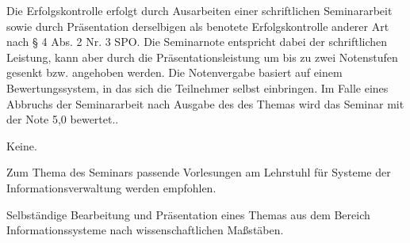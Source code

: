 \begin{course}

\setdoclanguagegerman
{}



\coursehead


\label{cour_6111.dp_997}


\begin{styleenv}
\begin{assessment}
Die Erfolgskontrolle erfolgt durch Ausarbeiten einer schriftlichen Seminararbeit sowie durch Präsentation derselbigen als benotete Erfolgskontrolle anderer Art nach § 4 Abs. 2 Nr. 3 SPO. \newline
Die Seminarnote entspricht dabei der schriftlichen Leistung, kann aber durch die Präsentationsleistung um bis zu zwei Notenstufen gesenkt bzw. angehoben werden. Die Notenvergabe basiert auf einem Bewertungssystem, in das sich die Teilnehmer selbst einbringen. Im Falle eines Abbruchs der Seminararbeit nach Ausgabe des des Themas wird das Seminar mit der Note 5,0 bewertet..


\end{assessment}

\begin{conditions}Keine.\end{conditions}

\begin{recommendations}Zum Thema des Seminars passende Vorlesungen am Lehrstuhl für Systeme der Informationsverwaltung werden empfohlen.

\end{recommendations}
\end{styleenv}

\begin{learningoutcomes}
Selbständige Bearbeitung und Präsentation eines Themas aus dem Bereich Informationssysteme nach wissenschaftlichen Maßstäben.



\end{learningoutcomes}
\end{course}
